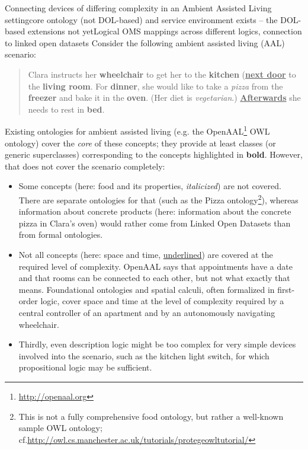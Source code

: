 \documentclass[10pt,fleqn,%
\ifpretendfinal
final%
\else
draft%
\fi,
]{scrreprt}
\makeatletter
\newcommand*{\cf}{cf.\@\xspace}
\newcommand*{\eg}{e.g.\@\xspace}
\makeatother
\begin{document}
\begin{usecase}{Connecting devices of differing complexity in an Ambient Assisted Living setting}{core ontology (not DOL-based) and service environment exists – the DOL-based extensions not yet}{Logical OMS mappings across different logics, connection to linked open datasets}
  Consider the following ambient assisted living (AAL) scenario:
  \begin{quote}
    Clara instructs her \textbf{wheelchair} to get her to the \textbf{kitchen} (\textbf{\underline{next door}} to the \textbf{living room}.  For \textbf{dinner}, she would like to take a \textit{pizza} from the \textbf{freezer} and bake it in the \textbf{oven}.  (Her diet is \textit{vegetarian}.)  \textbf{\underline{Afterwards}} she needs to rest in \textbf{bed}.
  \end{quote}
  Existing ontologies for ambient assisted living (\eg the OpenAAL\footnote{\url{http://openaal.org}} OWL ontology) cover the \emph{core} of these  concepts; they provide at least classes (or generic superclasses) corresponding to the concepts highlighted in \textbf{bold}.  However, that does not cover the scenario completely:
  \begin{itemize}
  \item Some concepts (here: food and its properties, \textit{italicized}) are not covered.  There are separate ontologies for that (such as the Pizza ontology\footnote{This is not a fully comprehensive food ontology, but rather a well-known sample OWL ontology; \cf \url{http://owl.cs.manchester.ac.uk/tutorials/protegeowltutorial/}}), whereas information about concrete products (here: information about the concrete pizza in Clara's oven) would rather come from Linked Open Datasets than from formal ontologies.
  \item Not all concepts (here: space and time, \underline{underlined}) are covered at the required level of complexity.  OpenAAL says that appointments have a date and that rooms can be connected to each other, but not what exactly that means.  Foundational ontologies and spatial calculi, often formalized in first-order logic, cover space and time at the level of complexity required by a central controller of an apartment and by an autonomously navigating wheelchair.
  \item Thirdly, even description logic might be too complex for very simple devices involved into the scenario, such as the kitchen light switch, for which propositional logic may be sufficient.
  \end{itemize}

\end{usecase}
\end{document}
